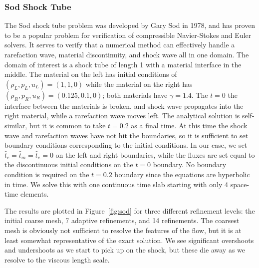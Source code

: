 \documentclass[Dissertation.tex]{subfiles}
\begin{document}
\subsubsection{Sod Shock Tube}
The Sod shock tube problem was developed by Gary Sod in 1978\cite{Sod1978}, and has proven to be a popular problem for verification 
of compressible Navier-Stokes and Euler solvers.
It serves to verify that a numerical method can effectively handle a rarefaction wave, material discontinuity, and shock wave
all in one domain.
The domain of interest is a shock tube of length 1 with a material interface in the middle. The material on the left has initial conditions of 
$(\rho_L,p_L,u_L)=(1,1,0)$ while the material on the right has $(\rho_R,p_R,u_R)=(0.125,0.1,0)$; both materials have $\gamma=1.4$. 
The $t=0$ the interface between the materials is broken, 
and shock wave propagates into the right material, while a rarefaction wave moves left. The analytical solution is self-similar, but it is common to take
$t=0.2$ as a final time.
At this time the shock wave and rarefaction waves have not hit the boundaries, 
so it is sufficient to set boundary conditions corresponding to the initial conditions.
In our case, we set $\hat t_c=\hat t_m=\hat t_e=0$ on the left and right boundaries, while the fluxes are set equal to the discontinuous
initial conditions on the $t=0$ boundary. 
No boundary condition is required on the $t=0.2$ boundary since the equations are hyperbolic in time.
We solve this with one continuous time slab starting with only 4 space-time elements.

The results are plotted in Figure~\ref{fig:sod} for three different refinement levels: the initial coarse mesh, 7 adaptive refinements, and 14 refinements.
The coarsest mesh is obviously not sufficient to resolve the features of the flow, but it is at least somewhat representative of the exact solution.
We see significant overshoots and undershoots as we start to pick up on the shock, but these die away as we resolve to the viscous length scale.
\end{document}
